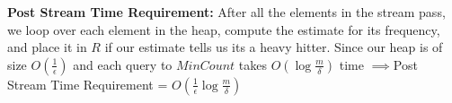 \documentclass[12pt]{article}
\begin{document}
\begin{solution}
\textbf{Post Stream Time Requirement:} After all the elements in the stream pass, we loop over each element in the heap, compute the estimate for its frequency, and place it in $R$ if our estimate tells us its a heavy hitter. Since our heap is of size $O(\frac{1}{\epsilon})$ and each query to $MinCount$ takes $O(\log{\frac{m}{\delta}})$ time $\implies $Post Stream Time Requirement = $O(\frac{1}{\epsilon}\log{\frac{m}{\delta}})$

\end{solution}
\end{document}
